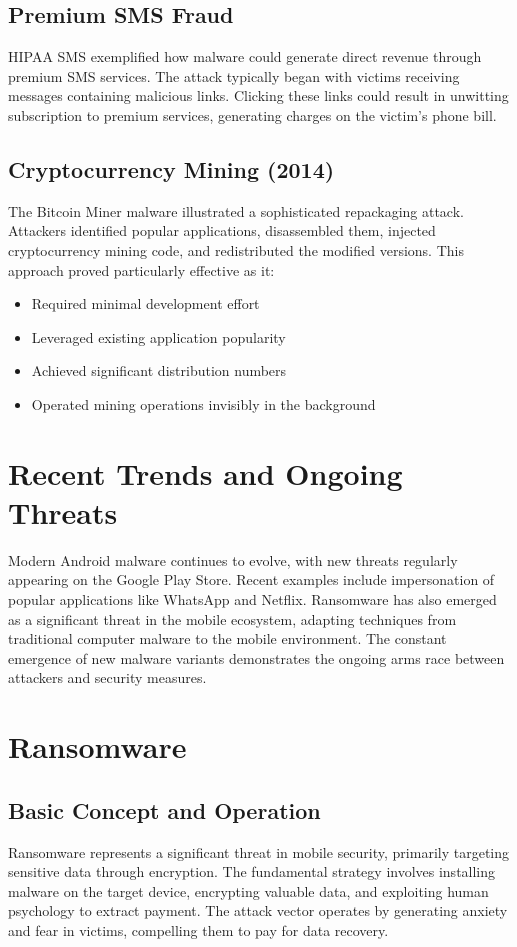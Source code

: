 \documentclass{article}
\begin{document}
\subsection{Premium SMS Fraud}
HIPAA SMS exemplified how malware could generate direct revenue through premium SMS services. The attack typically began with victims receiving messages containing malicious links. Clicking these links could result in unwitting subscription to premium services, generating charges on the victim's phone bill.

\subsection{Cryptocurrency Mining (2014)}
The Bitcoin Miner malware illustrated a sophisticated repackaging attack. Attackers identified popular applications, disassembled them, injected cryptocurrency mining code, and redistributed the modified versions. This approach proved particularly effective as it:

\begin{itemize}
    \item Required minimal development effort
    \item Leveraged existing application popularity
    \item Achieved significant distribution numbers
    \item Operated mining operations invisibly in the background
\end{itemize}

\section{Recent Trends and Ongoing Threats}
Modern Android malware continues to evolve, with new threats regularly appearing on the Google Play Store. Recent examples include impersonation of popular applications like WhatsApp and Netflix. Ransomware has also emerged as a significant threat in the mobile ecosystem, adapting techniques from traditional computer malware to the mobile environment. The constant emergence of new malware variants demonstrates the ongoing arms race between attackers and security measures.

\section{Ransomware}
\subsection{Basic Concept and Operation}
Ransomware represents a significant threat in mobile security, primarily targeting sensitive data through encryption. The fundamental strategy involves installing malware on the target device, encrypting valuable data, and exploiting human psychology to extract payment. The attack vector operates by generating anxiety and fear in victims, compelling them to pay for data recovery.
\end{document}
